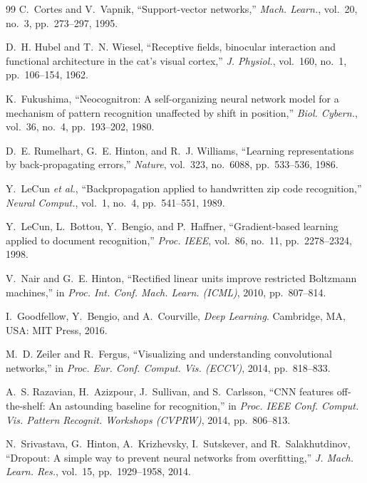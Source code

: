 \documentclass[conference]{IEEEtran}
\begin{document}
\begin{thebibliography}{99}
C.~Cortes and V.~Vapnik, ``Support-vector networks,'' \emph{Mach. Learn.}, vol.~20, no.~3, pp.~273--297, 1995.

D.~H. Hubel and T.~N. Wiesel, ``Receptive fields, binocular interaction and functional architecture in the cat's visual
cortex,'' \emph{J. Physiol.}, vol.~160, no.~1, pp.~106--154, 1962.

K.~Fukushima, ``Neocognitron: A self-organizing neural network model for a mechanism of pattern recognition unaffected
by shift in position,'' \emph{Biol. Cybern.}, vol.~36, no.~4, pp.~193--202, 1980.

D.~E. Rumelhart, G.~E. Hinton, and R.~J. Williams, ``Learning representations by back-propagating errors,''
\emph{Nature}, vol.~323, no.~6088, pp.~533--536, 1986.

Y.~LeCun \emph{et al.}, ``Backpropagation applied to handwritten zip code recognition,'' \emph{Neural Comput.}, vol.~1,
no.~4, pp.~541--551, 1989.

Y.~LeCun, L.~Bottou, Y.~Bengio, and P.~Haffner, ``Gradient-based learning applied to document recognition,''
\emph{Proc. IEEE}, vol.~86, no.~11, pp.~2278--2324, 1998.

V.~Nair and G.~E. Hinton, ``Rectified linear units improve restricted Boltzmann machines,'' in \emph{Proc. Int. Conf.
Mach. Learn. (ICML)}, 2010, pp.~807--814.

I.~Goodfellow, Y.~Bengio, and A.~Courville, \emph{Deep Learning}. Cambridge, MA, USA: MIT Press, 2016.

M.~D. Zeiler and R.~Fergus, ``Visualizing and understanding convolutional networks,'' in \emph{Proc. Eur. Conf. Comput.
Vis. (ECCV)}, 2014, pp.~818--833.

A.~S. Razavian, H.~Azizpour, J.~Sullivan, and S.~Carlsson, ``CNN features off-the-shelf: An astounding baseline for
recognition,'' in \emph{Proc. IEEE Conf. Comput. Vis. Pattern Recognit. Workshops (CVPRW)}, 2014, pp.~806--813.

N.~Srivastava, G.~Hinton, A.~Krizhevsky, I.~Sutskever, and R.~Salakhutdinov, ``Dropout: A simple way to prevent neural
networks from overfitting,'' \emph{J. Mach. Learn. Res.}, vol.~15, pp.~1929--1958, 2014.


\end{thebibliography}
\end{document}
